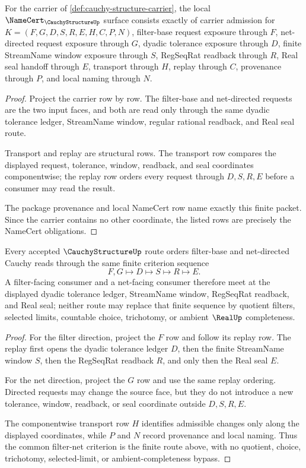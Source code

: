 \begin{theorem}
\label{thm:cauchy-structure-namecert-obligations}
For the carrier of \autoref{def:cauchy-structure-carrier}, the local $\NameCert_{\CauchyStructureUp}$ surface consists exactly of carrier admission for $K=(F,G,D,S,R,E,H,C,P,N)$, filter-base request exposure through $F$, net-directed request exposure through $G$, dyadic tolerance exposure through $D$, finite StreamName window exposure through $S$, RegSeqRat readback through $R$, Real seal handoff through $E$, transport through $H$, replay through $C$, provenance through $P$, and local naming through $N$.
\end{theorem}
\begin{proof}
Project the carrier row by row. The filter-base and net-directed requests are the two input faces, and both are read only through the same dyadic tolerance ledger, StreamName window, regular rational readback, and Real seal route.

Transport and replay are structural rows. The transport row compares the displayed request, tolerance, window, readback, and seal coordinates componentwise; the replay row orders every request through $D,S,R,E$ before a consumer may read the result.

The package provenance and local NameCert row name exactly this finite packet. Since the carrier contains no other coordinate, the listed rows are precisely the NameCert obligations.
\end{proof}

\begin{theorem}
\label{thm:cauchy-structure-filter-net-criterion}
Every accepted $\CauchyStructureUp$ route orders filter-base and net-directed Cauchy reads through the same finite criterion sequence
$$
F,G \longmapsto D \longmapsto S \longmapsto R \longmapsto E.
$$
A filter-facing consumer and a net-facing consumer therefore meet at the displayed dyadic tolerance ledger, StreamName window, RegSeqRat readback, and Real seal; neither route may replace that finite sequence by quotient filters, selected limits, countable choice, trichotomy, or ambient $\RealUp$ completeness.
\end{theorem}
\begin{proof}
For the filter direction, project the $F$ row and follow its replay row. The replay first opens the dyadic tolerance ledger $D$, then the finite StreamName window $S$, then the RegSeqRat readback $R$, and only then the Real seal $E$.

For the net direction, project the $G$ row and use the same replay ordering. Directed requests may change the source face, but they do not introduce a new tolerance, window, readback, or seal coordinate outside $D,S,R,E$.

The componentwise transport row $H$ identifies admissible changes only along the displayed coordinates, while $P$ and $N$ record provenance and local naming. Thus the common filter-net criterion is the finite route above, with no quotient, choice, trichotomy, selected-limit, or ambient-completeness bypass.
\end{proof}

